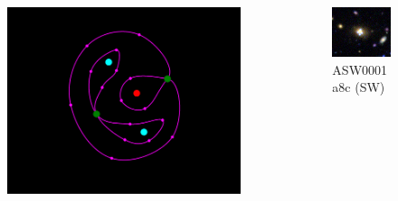 \documentclass[aspectratio=1610]{beamer}
\begin{document}
\begin{frame}
  \begin{columns}[T]
    \begin{column}{5.5cm}
      \begin{figure}
        \includegraphics[width=\textwidth]{imgs/sl-1}
      \end{figure}
    \end{column}
    \begin{column}{5.5cm}
    \begin{figure}
        \includegraphics[width=\textwidth]{imgs/real1}
        \caption{ASW0001a8c (SW)}
      \end{figure}
    \end{column}
  \end{columns}
\end{frame}
\end{document}

